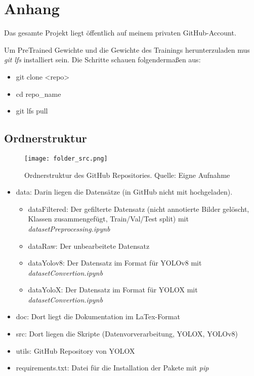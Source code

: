 \chapter{Anhang}\label{chap:appendix}
Das gesamte Projekt liegt öffentlich auf meinem privaten GitHub-Account. \cite{deepvisionProjectGitHub}

Um PreTrained Gewichte und die Gewichte des Trainings herunterzuladen mus \textit{git lfs} installiert sein.
Die Schritte schauen folgendermaßen aus:
\begin{itemize}
	\item git clone <repo>
	\item cd repo\_name
	\item git lfs pull
\end{itemize}

\section{Ordnerstruktur}
\begin{figure}[h]
	\centering
	\texttt{[image: folder\_src.png]}
	\caption[Ordnerstruktur des GitHub Repositories]{Ordnerstruktur des GitHub Repositories. Quelle: Eigne Aufnahme}
\end{figure}

\begin{itemize}
	\item data: Darin liegen die Datensätze (in GitHub nicht mit hochgeladen).
	\begin{itemize}
		\item dataFiltered: Der gefilterte Datensatz (nicht annotierte Bilder gelöscht, Klassen zusammengefügt, Train/Val/Test split) mit \textit{datasetPreprocessing.ipynb}
		\item dataRaw: Der unbearbeitete Datensatz \cite{datasetSelfDrivingCar}
		\item dataYolov8: Der Datensatz im Format für YOLOv8 mit \textit{datasetConvertion.ipynb}
		\item dataYoloX:  Der Datensatz im Format für YOLOX mit \textit{datasetConvertion.ipynb}
	\end{itemize}
	\item doc: Dort liegt die Dokumentation im LaTex-Format
	\item src: Dort liegen die Skripte (Datenvorverarbeitung, YOLOX, YOLOv8)
	\item utils: GitHub Repository von YOLOX
	\item requirements.txt: Datei für die Installation der Pakete mit \textit{pip}
\end{itemize}

